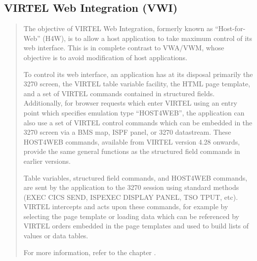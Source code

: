 \documentclass[letterpaper,10pt,english]{sphinxmanual}
\begin{document}
\subsection{VIRTEL Web Integration (VWI)}
\label{\detokenize{User_Guide:virtel-web-integration-vwi}}\begin{quote}

The objective of VIRTEL Web Integration, formerly known as
“Host-for-Web” (H4W), is to allow a host application to take maximum
control of its web interface. This is in complete contrast to
VWA/VWM, whose objective is to avoid modification of host
applications.

To control its web interface, an application has at its disposal
primarily the 3270 screen, the VIRTEL table variable facility, the
HTML page template, and a set of VIRTEL commands contained in
structured fields. Additionally, for browser requests which enter
VIRTEL using an entry point which specifies emulation type
“HOST4WEB”, the application can also use a set of VIRTEL control
commands which can be embedded in the 3270 screen via a BMS map,
ISPF panel, or 3270 datastream. These HOST4WEB commands, available
from VIRTEL version 4.28 onwards, provide the same general functions
as the structured field commands in earlier versions.

Table variables, structured field commands, and HOST4WEB commands,
are sent by the application to the 3270 session using standard
methods (EXEC CICS SEND, ISPEXEC DISPLAY PANEL, TSO TPUT, etc).
VIRTEL intercepts and acts upon these commands, for example by
selecting the page template or loading data which can be referenced
by VIRTEL orders embedded in the page templates and used to build
lists of values or data tables.

For more information, refer to the chapter {\hyperref[\detokenize{User_Guide:v457ug-programming-interfaces}]{}}.
\end{quote}
\label{\detokenize{User_Guide:v457ug-service-transactions}}
\end{document}
